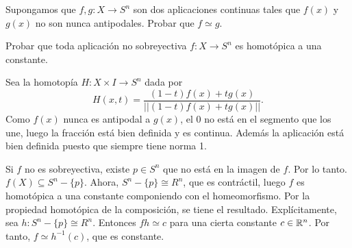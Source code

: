 \documentclass[twoside]{article}
\begin{document}
\begin{ejercicio}{6.4}
Supongamos que $f,g:X\to S^n$ son dos aplicaciones continuas tales que $f(x)$ y $g(x)$ no son nunca antipodales. Probar que $f\simeq g$. 

Probar que toda aplicación no sobreyectiva $f:X\to S^n$ es homotópica a una constante.
\end{ejercicio}
\begin{solucion}
Sea la homotopía $H:X\times I\to S^n$ dada por
\[
H(x,t)=\frac{(1-t)f(x)+tg(x)}{||(1-t)f(x)+tg(x)||}.
\]
Como $f(x)$ nunca es antipodal a $g(x)$, el 0 no está en el segmento que los une, luego la fracción está bien definida y es continua. Además la aplicación está bien definida puesto que siempre tiene norma 1. 

Si $f$ no es sobreyectiva, existe $p\in S^n$ que no está en la imagen de $f$. Por lo tanto. $f(X)\subseteq S^n-\{p\}$. Ahora, $S^n-\{p\}\cong R^n$, que es contráctil, luego $f$ es homotópica a una constante componiendo con el homeomorfismo. Por la propiedad homotópica de la composición, se tiene el resultado. Explícitamente, sea $h:S^n-\{p\}\cong R^n$. Entonces $fh\simeq c$ para una cierta constante $c\in\mathbb{R}^n$. Por tanto, $f\simeq h^{-1}(c)$, que es constante.
\end{solucion}

\newpage
\end{document}
